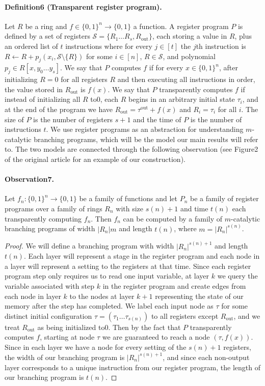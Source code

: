 \paragraph{Definition6 (Transparent register program).} Let $R$ be a ring and $f\in\{0,1\}^n\to\{0,1\}$ a function. A register program $P$ is defined by a set of registers $\mathcal S=\{R_1\ldots R_s,R_{\mathrm{out}}\}$, each storing a value in $R$, plus an ordered list of $t$ instructions where for every $j\in[t]$ the $j$th instruction is $R\leftarrow R+p_j(x_i,\mathcal S\setminus\{R\})$ for some $i\in[n]$, $R\in\mathcal S$, and polynomial $p_j\in R[x,y_0\ldots y_s]$.
We say that $P$ computes $f$ if for every $x\in\{0,1\}^n$, after initializing $R=0$ for all registers $R$ and then executing all instructions in order, the value stored in $R_{\mathrm{out}}$ is $f(x)$. We say that $P$ transparently computes $f$ if instead of initializing all $R$ to0, each $R$ begins in an arbitrary initial state $\tau_i$, and at the end of the program we have $R_{\mathrm{out}}=\tau^{\mathrm{out}}+f(x)$ and $R_i=\tau_i$ for all $i$. The size of $P$ is the number of registers $s+1$ and the time of $P$ is the number of instructions $t$.
We use register programs as an abstraction for understanding $m$-catalytic branching programs, which will be the model our main results will refer to. The two models are connected through the following observation (see Figure2 of the original article for an example of our construction).
\paragraph{Observation7.} Let $f_n:\{0,1\}^n\to\{0,1\}$ be a family of functions and let $P_n$ be a family of register programs over a family of rings $R_n$ with size $s(n)+1$ and time $t(n)$ each transparently computing $f_n$. Then $f_n$ can be computed by a family of $m$-catalytic branching programs of width $|R_n|m$ and length $t(n)$, where $m=|R_n|^{s(n)}$.
\begin{proof}
We will define a branching program with width $|R_n|^{s(n)+1}$ and length $t(n)$. Each layer will represent a stage in the register program and each node in a layer will represent a setting to the registers at that time. Since each register program step only requires us to read one input variable, at layer $k$ we query the variable associated with step $k$ in the register program and create edges from each node in layer $k$ to the nodes at layer $k+1$ representing the state of our memory after the step has completed. We label each input node as $\tau$ for some distinct initial configuration $\tau=(\tau_1\ldots\tau_{s(n)})$ to all registers except $R_{\mathrm{out}}$, and we treat $R_{\mathrm{out}}$ as being initialized to0. Then by the fact that $P$ transparently computes $f$, starting at node $\tau$ we are guaranteed to reach a node $(\tau,f(x))$. Since in each layer we have a node for every setting of the $s(n)+1$ registers, the width of our branching program is $|R_n|^{s(n)+1}$, and since each non-output layer corresponds to a unique instruction from our register program, the length of our branching program is $t(n)$.
\end{proof}
